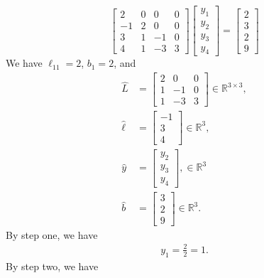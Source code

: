 \documentclass{report}
\begin{document}
        \[
            \begin{bmatrix}
                2 & 0 & 0 & 0 \\
                -1 & 2 & 0 & 0 \\
                3 & 1 & -1 & 0 \\
                4 & 1 & -3 & 3
            \end{bmatrix}
            \begin{bmatrix}
                y_{1} \\
                y_{2} \\
                y_{3} \\
                y_{4}
            \end{bmatrix}
            =
            \begin{bmatrix}
                2 \\
                3 \\
                2 \\
                9
            \end{bmatrix}
        \]
    We have $\ell_{11} = 2$, $b_{1} = 2$, and 
    \begin{align*}
        \hat{L} &= \begin{bmatrix} 2 & 0 & 0 \\1 & -1 & 0 \\ 1 & -3 & 3 \end{bmatrix} \in \mathbb{R}^{3\times 3}, \\
        \hat{\ell} &= \begin{bmatrix} -1 \\ 3 \\ 4\end{bmatrix} \in \mathbb{R}^{3}, \\
        \hat{y} &= \begin{bmatrix} y_{2} \\ y_{3} \\ y_{4} \end{bmatrix}, \in \mathbb{R}^{3}\\
        \hat{b} &= \begin{bmatrix} 3 \\ 2 \\ 9 \end{bmatrix} \in \mathbb{R}^{3}
    .\end{align*}
    By step one, we have 
    \begin{align*}
        y_{1} = \frac{2}{2} = 1
    .\end{align*}
    By step two, we have
\end{document}
